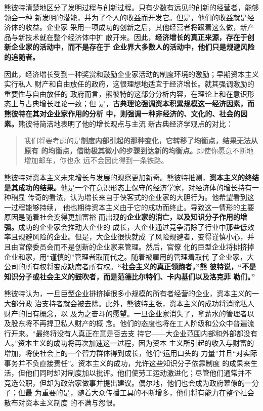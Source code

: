 熊彼特清楚地区分了发明过程与创新过程。只有少数有远见的创新的经营者，能够领会一种
新发明的潜能，并为了个人的收益而开发它。但是，他们的收益就是经济体的收益。企业家
采用一项成功的创新之后，其他经营者将跟着这么做，新产品与新技术就在整个经济体中扩
散开来。因此，\textbf{经济增长的真正来源，存在于创新企业家的活动中，而不是存在于
  企业界大多数人的活动中，他们只是规避风险的追随者。}

因此，经济增长受到一种奖赏和鼓励企业家活动的制度环境的激励；早期资本主义实行私人
财产和自由放任的政府，这很理想地适宜于经济增长。就其强调激励的重要性与自由放任的
政府而言，熊彼特的这部分分析内容，在理论上和在意识形态上与古典增长理论一致；但
是，\textbf{古典理论强调资本积累规模这一经济因素，而熊彼特在其对企业家作用的分析
中，则强调一种非经济的、文化的、社会的因素。}熊彼特简洁地表明了他的增长观点与主流
新古典经济学观点的对比：

\begin{quotation}
  我们将要考虑的是\textbf{制度内部引起的那种变化，它转移了均衡点，结果无法从原有
    的均衡点，借助极其微小的步骤到达新的均衡点。}即使你愿意不断地增加邮车，你也永
  远不会因此得到一条铁路。
\end{quotation}

熊彼特对资本主义未来增长与发展的观察更加新奇。熊彼特推测，\textbf{资本主义的终结
  是其成功的结果。}他是一个在意识形态上保守的经济学家，对经济体的增长持有一种稍显
传奇的看法，认为增长来自于侠客式的企业家的大胆行为。他希望看到这一过程能够持续，
他也期待资本主义由于它的成功而终止。导致这一情形的主要原因是随着社会变得更加富裕
而出现的\textbf{企业家的消亡，以及知识分子作用的增强。}成功的企业家会推动大企业的
成长，大企业通过竞争清除了行业中那些低效率且规避风险的企业。但是，大企业很快就成
了风险规避者，变得谨慎小心，并且由官僚委员会而不是创新的企业家来管理。然后，官僚
化的巨型企业将排挤掉企业和家，用“谨慎的”管理者取而代之。随着被雇用的管理着取代
了企业家，大公司的所有权将变成缺席者所有权。\textbf{“社会主义的真正领跑者，”熊
  彼特说，“不是知识分子或社会主义的鼓吹者，而是范德比尔特们、卡内基们以及洛克菲
  勒们。”}

熊彼特认为，一旦巨型企业排挤掉很多小规模的所有者经营的企业，资本主义的一大部分政
治支持者就会被去除。此外，熊彼特主张，资本主义的成功将消除私人财产的旧有概念，以
及为之奋斗的愿望。一旦企业家消失了，拿薪水的管理者以及股东将不再捍卫私人财产的概
念。他们的态度也将在工人阶级和公众中普遍流行开来。“最终将没有人真正在意是否去支
持它——大企业范围内部和外部都没有人。”资本主义的成功将再次加速这一过程，因为资本
主义所引起的收入与财富的增加，将使社会上的一个智力群体得到成长，他们“运用口头的
力量”并且“对实际事务并不负直接责任”。资本主义的成功，允许这些知识分子依靠制度
的成果来生活，但他们同时却对制度加以批评。他们使劳工运动激进化；尽管他们通常并不
竞选公职，但却为政治家做事并提出建议。偶尔地，他们也会成为政府幕僚的一分子；但最
为重要的是，随着大众传播工具的不断增多，他们将有能力在整个社会散布对资本主义制度
的不满与怨恨。

